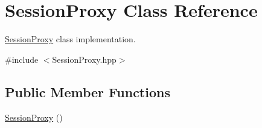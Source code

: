 \hypertarget{classSessionProxy}{
\section{SessionProxy Class Reference}
\label{classSessionProxy}
}


\hyperlink{classSessionProxy}{SessionProxy} class implementation.  




{\ttfamily \#include $<$SessionProxy.hpp$>$}

\subsection*{Public Member Functions}
\begin{DoxyCompactItemize}
\item 
\hypertarget{classSessionProxy_a17f33046c18759a0a9ff65e74ffdbeaf}{
\hyperlink{classSessionProxy_a17f33046c18759a0a9ff65e74ffdbeaf}{SessionProxy} ()}
\label{classSessionProxy_a17f33046c18759a0a9ff65e74ffdbeaf}


\end{DoxyCompactItemize}
